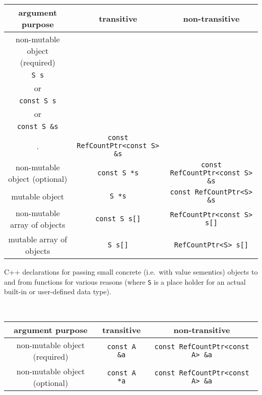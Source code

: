 \begin{table}
%
\begin{minipage}{{}\textwidth}
\begin{tabular}{|c|c|c|}
\hline
argument purpose
& transitive
& non-transitive \\
\hline
non-mutable object (required)
& \begin{minipage}{12ex}
    \begin{center}
    {\tiny .}\\
    {}\texttt{S s} \\
    or \\
    {}\texttt{const S s} \\
    or \\
    {}\texttt{const S \&s} \\
    {\tiny .}
    \end{center}
  \end{minipage}
& {}\texttt{const RefCountPtr<const S> \&s} \\
\hline
non-mutable object (optional)
& {}\texttt{const S *s}
& {}\texttt{const RefCountPtr<const S> \&s} \\
\hline
mutable object
& {}\texttt{S *s}
& {}\texttt{const RefCountPtr<S> \&s} \\
\hline
non-mutable array of objects
& {}\texttt{const S s[]}
& {}\texttt{RefCountPtr<const S> s[]} \\
\hline
mutable array of objects
& {}\texttt{S s[]}
& {}\texttt{RefCountPtr<S> s[]} \\
\hline
\end{tabular}
\begin{center}
C++ declarations for passing small concrete (i.e.~with value
sementics) objects to and from functions for various reasons (where
{}\texttt{S} is a place holder for an actual built-in or user-defined
data type).
\end{center}
\end{minipage}
%
\\[5ex]
%
\begin{minipage}{{}\textwidth}
\begin{tabular}{|c|c|c|}
\hline
argument purpose
& transitive
& non-transitive \\
\hline
non-mutable object (required)
& {}\texttt{const A \&a}
& {}\texttt{const RefCountPtr<const A> \&a} \\
\hline
non-mutable object (optional)
& {}\texttt{const A *a}
& {}\texttt{const RefCountPtr<const A> \&a} \\

\end{tabular}
\end{minipage}
\end{table}
